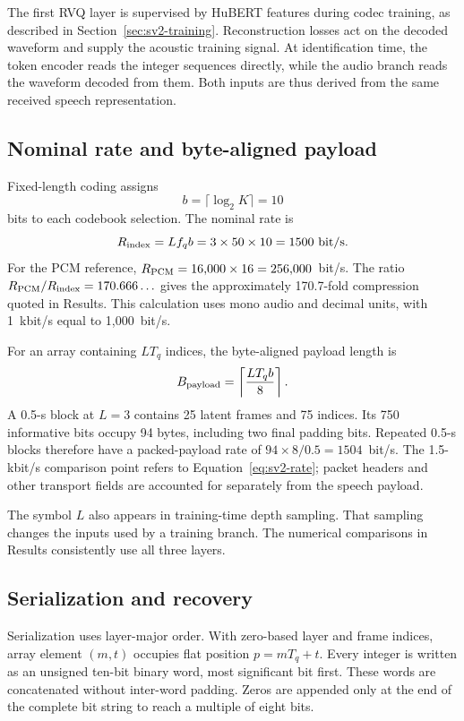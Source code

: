 The first RVQ layer is supervised by HuBERT features during codec training, as described in Section~\ref{sec:sv2-training}. Reconstruction losses act on the decoded waveform and supply the acoustic training signal. At identification time, the token encoder reads the integer sequences directly, while the audio branch reads the waveform decoded from them. Both inputs are thus derived from the same received speech representation.

\subsection{Nominal rate and byte-aligned payload}
Fixed-length coding assigns
\begin{equation}
 b=\lceil\log_2K\rceil=10
 \label{eq:sv2-bits}
\end{equation}
bits to each codebook selection. The nominal rate is
\begin{equation}
 R_{\rm index}=L f_q b
             =3\times50\times10
             =1500\ {\rm bit/s}.
 \label{eq:sv2-rate}
\end{equation}
For the PCM reference, $R_{\rm PCM}=16{,}000\times16=256{,}000$~bit/s. The ratio $R_{\rm PCM}/R_{\rm index}=170.666\ldots$ gives the approximately 170.7-fold compression quoted in Results. This calculation uses mono audio and decimal units, with 1~kbit/s equal to 1,000~bit/s.

For an array containing $LT_q$ indices, the byte-aligned payload length is
\begin{equation}
 B_{\rm payload}=\left\lceil\frac{LT_qb}{8}\right\rceil.
 \label{eq:sv2-bytes}
\end{equation}
A 0.5-s block at $L=3$ contains 25 latent frames and 75 indices. Its 750 informative bits occupy 94 bytes, including two final padding bits. Repeated 0.5-s blocks therefore have a packed-payload rate of $94\times8/0.5=1504$~bit/s. The 1.5-kbit/s comparison point refers to Equation~\ref{eq:sv2-rate}; packet headers and other transport fields are accounted for separately from the speech payload.

The symbol $L$ also appears in training-time depth sampling. That sampling changes the inputs used by a training branch. The numerical comparisons in Results consistently use all three layers.

\subsection{Serialization and recovery}
Serialization uses layer-major order. With zero-based layer and frame indices, array element $(m,t)$ occupies flat position $p=mT_q+t$. Every integer is written as an unsigned ten-bit binary word, most significant bit first. These words are concatenated without inter-word padding. Zeros are appended only at the end of the complete bit string to reach a multiple of eight bits.

